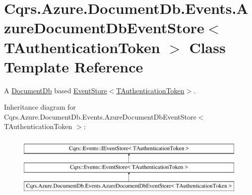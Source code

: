 \hypertarget{classCqrs_1_1Azure_1_1DocumentDb_1_1Events_1_1AzureDocumentDbEventStore}{}\section{Cqrs.\+Azure.\+Document\+Db.\+Events.\+Azure\+Document\+Db\+Event\+Store$<$ T\+Authentication\+Token $>$ Class Template Reference}
\label{classCqrs_1_1Azure_1_1DocumentDb_1_1Events_1_1AzureDocumentDbEventStore}


A \hyperlink{namespaceCqrs_1_1Azure_1_1DocumentDb}{Document\+Db} based \hyperlink{classCqrs_1_1Events_1_1EventStore_a6346cb2aea4c5b4e740dc6cfb15abab8_a6346cb2aea4c5b4e740dc6cfb15abab8}{Event\+Store$<$\+T\+Authentication\+Token$>$}.  


Inheritance diagram for Cqrs.\+Azure.\+Document\+Db.\+Events.\+Azure\+Document\+Db\+Event\+Store$<$ T\+Authentication\+Token $>$\+:\begin{figure}[H]
\begin{center}
\leavevmode
\includegraphics[height=3.000000cm]{classCqrs_1_1Azure_1_1DocumentDb_1_1Events_1_1AzureDocumentDbEventStore}
\end{center}
\end{figure}
